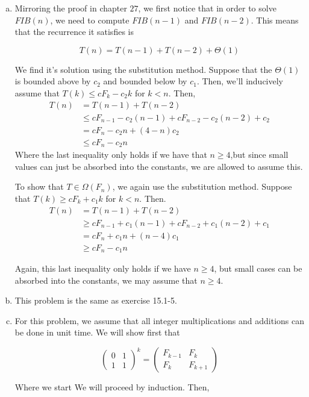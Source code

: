 \documentclass{article}
\begin{document}
\begin{enumerate}[a.]
\item
Mirroring the proof in chapter $27$, we first notice that in order to solve $FIB(n)$, we need to compute $FIB(n-1)$ and $FIB(n-2)$. This means that the recurrence it satisfies is

\[
T(n) = T(n-1) + T(n-2) + \Theta(1)
\]

We find it's solution using the substitution method. Suppose that the $\Theta(1)$ is bounded above by $c_2$ and bounded below by $c_1$. Then, we'll inducively assume that $T(k) \le cF_k - c_2k$ for $k<n$. Then,
\begin{align*}
T(n) &= T(n-1) + T(n-2) \\
&\le cF_{n-1} - c_2(n-1) + cF_{n-2} - c_2(n-2) + c_2\\
&= cF_n -c_2 n + (4 -n) c_2\\
&\le cF_n -c_2 n
\end{align*}
Where the last inequality only holds if we have that $n\ge 4$,but since small values can just be absorbed into the constants, we are allowed to assume this.

To show that $T\in \Omega(F_n)$, we again use the substitution method. Suppose that $T(k) \ge c F_k + c_1 k$ for $k<n$. Then.
\begin{align*}
T(n) &= T(n-1) + T(n-2) \\
&\ge cF_{n-1} + c_1(n-1) + cF_{n-2} + c_1(n-2) + c_1\\
&= cF_n +c_1 n + (n-4) c_1\\
&\ge cF_n -c_1 n
\end{align*}

Again, this last inequality only holds if we have $n\ge 4$, but small cases can be absorbed into the constants, we may assume that $n\ge 4$.

\item
This problem is the same as exercise 15.1-5.
\item
For this problem, we assume that all integer multiplications and additions can be done in unit time. We will show first that

\[
\left( \begin{array}{cc}0&1\\1&1\end{array}\right)^k = \left( \begin{array}{cc}F_{k-1}&F_{k}\\F_{k}&F_{k+1}\end{array}\right)
\]

Where we start We will proceed by induction. Then, 


\end{enumerate}
\end{document}
